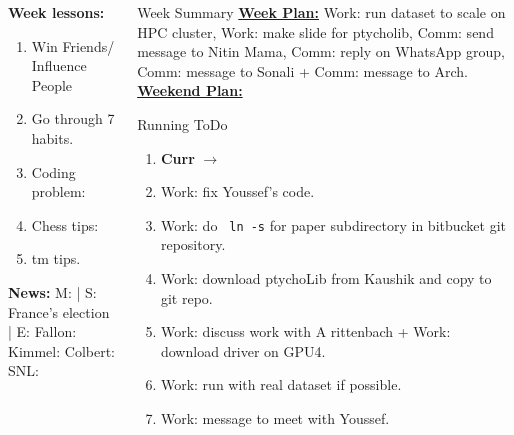 \begin{columns}
\begin{column}{0.20\linewidth}
      \begin{block}
        {\tiny {\bf Week lessons:}}
        \begin{enumerate}
          \tiny \item \tiny Win Friends/ Influence People
        \item \tiny Go through 7 habits.
        \item \tiny Coding problem: 
        \item \tiny Chess tips: 
        \item \tiny tm tips.
        \end{enumerate}
            {{\tiny {\tiny \bf  News:}} {\tiny  M: | S: France's election | E:
              Fallon:   Kimmel:  Colbert: SNL:}}
      \end{block}
    \end{column}
  \begin{column}{0.6\linewidth}
    \begin{block}{Week Summary} 
      {\underline {\bf Week Plan:}
        Work: run dataset to scale on HPC cluster, Work: make slide
        for ptycholib, Comm: send message to Nitin Mama, Comm: reply
        on  WhatsApp group, Comm: message to Sonali + Comm: message to
      Arch. } \\

      {\underline{\bf Weekend Plan:} }\\
    \end{block}
      \begin{block}{Running ToDo} %
        \begin{enumerate} 
          \item \tiny \textbf{Curr} $\rightarrow$
          \item \tiny Work: fix Youssef's code.
          \item \tiny Work: do \texttt{ ln -s} for paper subdirectory
            in bitbucket git repository.
          \item \tiny Work: download ptychoLib from Kaushik and copy
            to git repo.
          \item \tiny Work: discuss work with A rittenbach + Work:
            download driver on GPU4. 
          \item \tiny Work: run with real dataset if possible. 

          \item \tiny Work: message to meet with Youssef.  


\end{enumerate}
\end{block}
\end{column}
\end{columns}
